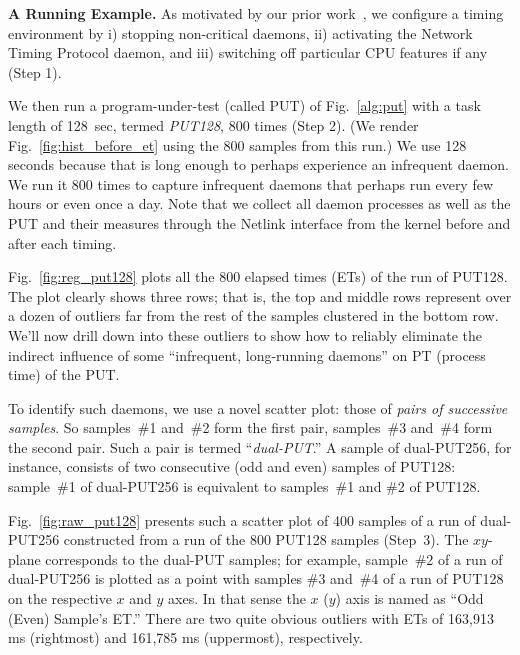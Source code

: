 \documentclass[letter]{ieice}
\begin{document}
{\bf A Running Example.} 
As motivated by our prior work~\cite{Currim}, 
we configure a timing environment by i) stopping non-critical daemons, 
ii) activating the Network Timing Protocol daemon, and 
iii) switching off particular CPU features\cite{intel15,intelSpeed15} if any (Step 1). 

We then run a program-under-test (called PUT) of 
Fig.~\ref{alg:put} with a task length of 128~sec, 
termed {\em PUT128}, 800 times (Step 2). 
(We render Fig.~\ref{fig:hist_before_et} using the 800 samples from this run.)
We use 128 seconds because that is long enough to perhaps experience an infrequent daemon. 
We run it 800 times to capture infrequent daemons that perhaps run every few hours or even 
once a day. 
Note that we collect all daemon processes as well as the PUT and their measures 
through the Netlink interface from the kernel before and after each 
timing.

Fig.~\ref{fig:reg_put128} plots all the 800 elapsed times (ETs) of the run of PUT128.
The plot clearly shows three rows; that is, 
the top and middle rows represent over a dozen of outliers far from 
the rest of the samples clustered in the bottom row. 
We'll now drill down into these outliers to 
show how to reliably eliminate the indirect influence of 
some ``infrequent, long-running daemons'' on PT (\hbox{process} time) of the PUT.

To identify such daemons, we use a novel \hbox{scatter} plot: 
those of {\em pairs of successive samples}{\color{blue}. 
So \hbox{samples}~\#{1} and~\#{2} form the first pair, 
samples~\#{3} and~\#{4} form the second pair.
Such a pair is termed ``\hbox{{\it dual-PUT}}.'' 
A sample of \hbox{dual-PUT256}, for instance, 
consists of two consecutive (odd and even) 
samples of PUT128: 
sample~\#{1} of dual-PUT256 is equivalent 
to samples~\#{1} and \#{2} of PUT128.}

Fig.~\ref{fig:raw_put128} presents such a scatter plot 
of 400 samples of a run of \hbox{dual-PUT256} constructed 
from a run of the 800 PUT128 samples (Step~3). 
{\color{blue} The $xy$-plane corresponds to the dual-PUT samples; 
for example, \hbox{sample}~\#{2} of a run of dual-PUT256 
is plotted as a point with samples \#{3} and~\#{4} of a run of PUT128 
on the respective $x$ and $y$ axes. In that sense 
the $x$ ($y$) axis is named as ``Odd (Even) Sample's ET.''}
There are two quite obvious outliers with ETs 
of 163,913 ms (rightmost) and 161,785 ms (uppermost), respectively.
\end{document}
